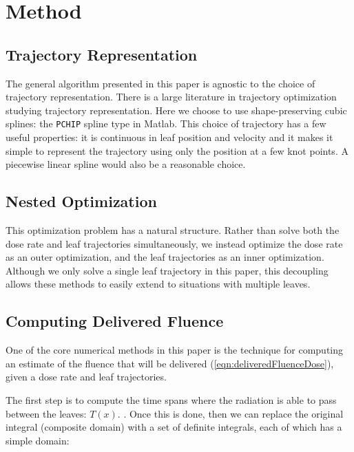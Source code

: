 \section{Method}

\subsection{Trajectory Representation}

The general algorithm presented in this paper is agnostic to the choice of trajectory representation.
There is a large literature in trajectory optimization studying trajectory representation. 
Here we choose to use shape-preserving cubic splines: the \texttt{PCHIP} spline type in Matlab.
This choice of trajectory has a few useful properties: it is continuous in leaf position and velocity
and it makes it simple to represent the trajectory using only the position at a few knot points.
A piecewise linear spline would also be a reasonable choice.


\subsection{Nested Optimization}

This optimization problem has a natural structure. 
Rather than solve both the dose rate and leaf trajectories simultaneously,
we instead optimize the dose rate as an outer optimization, and the leaf trajectories as an inner optimization.
Although we only solve a single leaf trajectory in this paper, this decoupling allows these methods to easily extend to situations with multiple leaves.


\subsection{Computing Delivered Fluence}

One of the core numerical methods in this paper is the technique for computing an estimate of the fluence
that will be delivered (\ref{eqn:deliveredFluenceDose}), given a dose rate and leaf trajectories.

The first step is to compute the time spans where the radiation is able to pass between the leaves: $T(x)$.
.
Once this is done, then we can replace the original integral (composite domain) with a set of definite integrals,
each of which has a simple domain:

